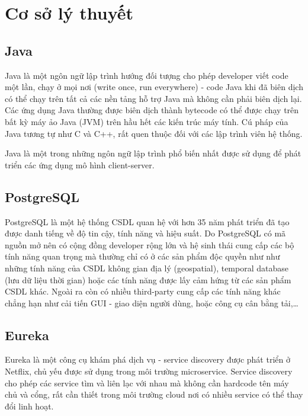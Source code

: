 \documentclass[report.tex]{subfiles}
\begin{document}
\pagebreak

\chapter[Chương 1. Cơ sở lý thuyết]{Cơ sở lý thuyết}

\section{Java}

Java là một ngôn ngữ lập trình hướng đối tượng cho phép developer viết code một lần, chạy ở mọi nơi (write once, run everywhere) - code Java khi đã biên dịch có thể chạy trên tất cả các nền tảng hỗ trợ Java mà không cần phải biên dịch lại.
Các ứng dụng Java thường được biên dịch thành bytecode có thể được chạy trên bất kỳ máy ảo Java (JVM) trên hầu hết các kiến trúc máy tính.
Cú pháp của Java tương tự như C và C++, rất quen thuộc đối với các lập trình viên hệ thống.\newline

Java là một trong những ngôn ngữ lập trình phổ biến nhất được sử dụng để phát triển các ứng dụng mô hình client-server.

\section{PostgreSQL}

PostgreSQL là một hệ thống CSDL quan hệ với hơn 35 năm phát triển đã tạo được danh tiếng về độ tin cậy, tính năng và hiệu suất.
\newline
Do PostgreSQL có mã nguồn mở nên có cộng đồng developer rộng lớn và hệ sinh thái cung cấp các bộ tính năng quan trọng mà thường chỉ có ở các sản phẩm độc quyền như như những tính năng của CSDL không gian địa lý (geospatial), temporal database (lưu dữ liệu thời gian) hoặc các tính năng được lấy cảm hứng từ các sản phẩm CSDL khác.
Ngoài ra còn có nhiều third-party cung cấp các tính năng khác chẳng hạn như cải tiến GUI - giao diện người dùng, hoặc công cụ cân bằng tải,\dots

\section{Eureka}

Eureka là một công cụ khám phá dịch vụ - service discovery được phát triển ở Netflix, chủ yếu được sử dụng trong môi trường microservice. 
\newline
Service discovery cho phép các service tìm và liên lạc với nhau mà không cần hardcode tên máy chủ và cổng,
rất cần thiết trong môi trường cloud nơi có nhiều service có thể thay đổi linh hoạt.
\end{document}
